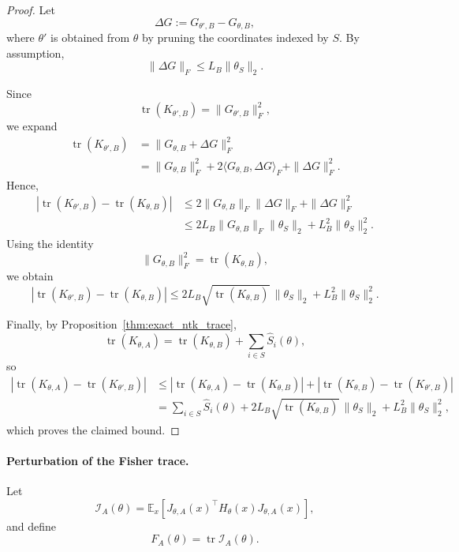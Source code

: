 \documentclass{article}
\theoremstyle{definition}
\theoremstyle{remark}
\begin{document}
\begin{proof}
Let
\[
\Delta G := G_{\theta',B}-G_{\theta,B},
\]
where $\theta'$ is obtained from $\theta$ by pruning the coordinates indexed by
$S$. By assumption,
\[
\|\Delta G\|_F \le L_B\|\theta_S\|_2.
\]

Since
\[
\operatorname{tr}(K_{\theta',B})
=
\|G_{\theta',B}\|_F^2,
\]
we expand
\[
\begin{aligned}
\operatorname{tr}(K_{\theta',B})
&=
\|G_{\theta,B}+\Delta G\|_F^2 \\
&=
\|G_{\theta,B}\|_F^2
+
2\langle G_{\theta,B},\Delta G\rangle_F
+
\|\Delta G\|_F^2.
\end{aligned}
\]
Hence,
\[
\begin{aligned}
\left|
\operatorname{tr}(K_{\theta',B})
-
\operatorname{tr}(K_{\theta,B})
\right|
&\le
2\|G_{\theta,B}\|_F\|\Delta G\|_F
+
\|\Delta G\|_F^2 \\
&\le
2L_B\|G_{\theta,B}\|_F\|\theta_S\|_2
+
L_B^2\|\theta_S\|_2^2.
\end{aligned}
\]
Using the identity
\[
\|G_{\theta,B}\|_F^2
=
\operatorname{tr}(K_{\theta,B}),
\]
we obtain
\[
\left|
\operatorname{tr}(K_{\theta',B})
-
\operatorname{tr}(K_{\theta,B})
\right|
\le
2L_B
\sqrt{\operatorname{tr}(K_{\theta,B})}
\,
\|\theta_S\|_2
+
L_B^2\|\theta_S\|_2^2.
\]

Finally, by Proposition~\ref{thm:exact_ntk_trace},
\[
\operatorname{tr}(K_{\theta,A})
=
\operatorname{tr}(K_{\theta,B})
+
\sum_{i\in S}\widehat S_i(\theta),
\]
so
\[
\begin{aligned}
\left|
\operatorname{tr}(K_{\theta,A})
-
\operatorname{tr}(K_{\theta',B})
\right|
&\le
\left|
\operatorname{tr}(K_{\theta,A})
-
\operatorname{tr}(K_{\theta,B})
\right|
+
\left|
\operatorname{tr}(K_{\theta,B})
-
\operatorname{tr}(K_{\theta',B})
\right| \\
&=
\sum_{i\in S}\widehat S_i(\theta)
+
2L_B
\sqrt{\operatorname{tr}(K_{\theta,B})}
\,
\|\theta_S\|_2
+
L_B^2\|\theta_S\|_2^2,
\end{aligned}
\]
which proves the claimed bound.
\end{proof}

\paragraph{Perturbation of the Fisher trace.}

Let
\[
\mathcal I_A(\theta)
=
\mathbb E_x
\!\left[
J_{\theta,A}(x)^\top
H_\theta(x)
J_{\theta,A}(x)
\right],
\]
and define
\[
F_A(\theta)
=
\operatorname{tr}\mathcal I_A(\theta).
\]
\end{document}
